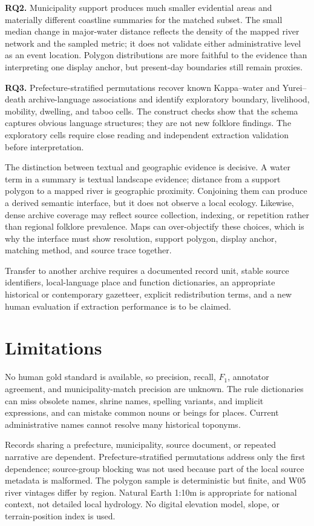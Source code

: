 \documentclass[9pt,twocolumn,a4paper]{extarticle}
\begin{document}
\textbf{RQ2.} Municipality support produces much smaller evidential areas and materially different coastline summaries for the matched subset. The small median change in major-water distance reflects the density of the mapped river network and the sampled metric; it does not validate either administrative level as an event location. Polygon distributions are more faithful to the evidence than interpreting one display anchor, but present-day boundaries still remain proxies.

\textbf{RQ3.} Prefecture-stratified permutations recover known Kappa--water and Yurei--death archive-language associations and identify exploratory boundary, livelihood, mobility, dwelling, and taboo cells. The construct checks show that the schema captures obvious language structures; they are not new folklore findings. The exploratory cells require close reading and independent extraction validation before interpretation.

The distinction between textual and geographic evidence is decisive. A water term in a summary is textual landscape evidence; distance from a support polygon to a mapped river is geographic proximity. Conjoining them can produce a derived semantic interface, but it does not observe a local ecology. Likewise, dense archive coverage may reflect source collection, indexing, or repetition rather than regional folklore prevalence. Maps can over-objectify these choices, which is why the interface must show resolution, support polygon, display anchor, matching method, and source trace together.

Transfer to another archive requires a documented record unit, stable source identifiers, local-language place and function dictionaries, an appropriate historical or contemporary gazetteer, explicit redistribution terms, and a new human evaluation if extraction performance is to be claimed.

\section{Limitations}

No human gold standard is available, so precision, recall, \(F_1\), annotator agreement, and municipality-match precision are unknown. The rule dictionaries can miss obsolete names, shrine names, spelling variants, and implicit expressions, and can mistake common nouns or beings for places. Current administrative names cannot resolve many historical toponyms.

Records sharing a prefecture, municipality, source document, or repeated narrative are dependent. Prefecture-stratified permutations address only the first dependence; source-group blocking was not used because part of the local source metadata is malformed. The polygon sample is deterministic but finite, and W05 river vintages differ by region. Natural Earth 1:10m is appropriate for national context, not detailed local hydrology. No digital elevation model, slope, or terrain-position index is used.
\end{document}
